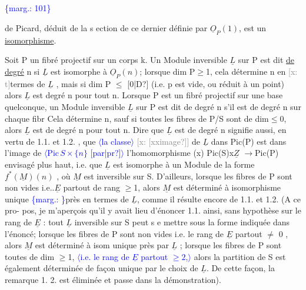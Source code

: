 \documentclass[11pt]{article}
\newcommand{\scanpage}[1]{\par\bigskip\noindent{\small\sffamily[scan #1]}\par}
\newcommand{\mspage}[1]{{\small\sffamily[p.\,#1]}}
\newcommand{\inserted}[2][]{\textcolor{blue}{$\langle$#2$\rangle$}}
\newcommand{\margin}[1]{\textcolor{blue}{\{\textsf{marg.:} #1\}}}
\newcommand{\xout}[1]{\textcolor{gray}{[\textsf{x:} #1]}}
\newcommand{\uline}[1]{\underline{#1}}
\newcommand{\unsure}[1]{[#1?]}
\begin{document}
\margin{101}

\clearpage
\scanpage{25/102}
\mspage{5}
de Picard, déduit de la s ection de ce dernier définie par $\underline{O}_P(1)$, est un
\uline{isomorphisme}.

Soit P un fibré projectif sur un corps k. Un Module inversible
$\underline{L}$ sur P est dit \uline{de degré} n si $\underline{L}$ est isomorphe à $\underline{O}_P(n)$; lorsque
dim P$\geq$1, cela détermine n en \xout{t}termes de $\underline{L}$ , mais si dim P $\leq$ \unsure{0|D}
(i.e. p est vide, ou réduit à un point) alors $\underline{L}$ est degré n pour tout n.
Lorsque P est un fibré projectif sur une base quelconque, un Module
inversible $\underline{L}$ sur P est dit de degré n s'il est de degré n sur chaque fibr
Cela détermine n, sauf si toutes les fibres de P/S sont de dim$\leq$0, alors
$\underline{L}$ est de degré n pour tout n. Dire que $\underline{L}$ est de degré n signifie aussi,
en vertu de 1.1. et 1.2. , que \inserted[typed]{la classe} \xout{\unsure{xximage}} de $\underline{L}$ dans Pic(P) est dans
l'image de \inserted{$\mathrm{Pic}\,S\times\{n\}$ \unsure{par|pr}} l'homomorphisme (x) Pic(S)x$\underline{Z}$ $\longrightarrow$Pic(P) envisagé plus haut,
i.e. que $\underline{L}$ est isomorphe à un Module de la forme $f^*(\underline{M})(n)$ , où $\underline{M}$ est
inversible sur S. D'ailleurs, lorsque les fibres de P sont non vides
i.e..$\underline{E}$ partout de rang $\geq$1, alors $\underline{M}$ est déterminé à isomorphisme unique
\margin{\textbar}près en termes de $\underline{L}$, comme il résulte encore de 1.1. et 1.2. (A ce pro-%
pos, je m'aperçois qu'il y avait lieu d'énoncer 1.1. ainsi, sans hypothèse
sur le rang de $\underline{E}$ : tout $\underline{L}$ inversible sur S peut s e mettre sous la forme
indiquée dans l'énoncé; lorsque les fibres de P sont non vides i.e. le
rang de $\underline{E}$ partout $\neq$ 0 , alors $\underline{M}$ est déterminé à isom unique près par
$\underline{L}$ ; lorsque les fibres de P sont toutes de dim $\geq$1, \inserted{i.e. le rang de $\underline{E}$ partout $\geq 2$,} alors la partition
de S est également déterminée de façon unique par le choix de $\underline{L}$. De cette
façon, la remarque 1. 2. est éliminée et passe dans la démonstration).
\end{document}
